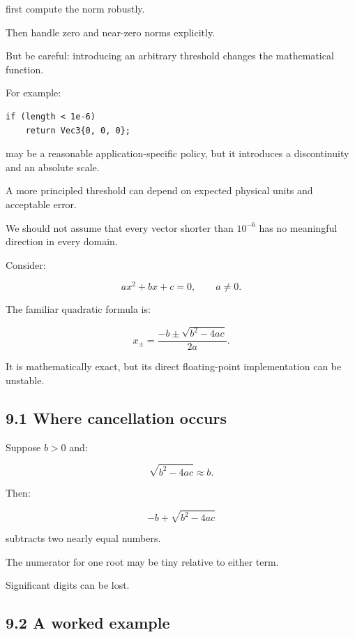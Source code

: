 first compute the norm robustly.

Then handle zero and near-zero norms explicitly.

But be careful: introducing an arbitrary threshold changes the mathematical function.

For example:

\begin{verbatim}
if (length < 1e-6)
    return Vec3{0, 0, 0};
\end{verbatim}

may be a reasonable application-specific policy, but it introduces a discontinuity and an absolute scale.

A more principled threshold can depend on expected physical units and acceptable error.

We should not assume that every vector shorter than \(10^{-6}\) has no meaningful direction in every domain.

Consider:

\[ \boxed{ax^2+bx+c=0}, \qquad a\ne0. \]

The familiar quadratic formula is:

\[ \boxed{ x_\pm= \frac{-b\pm\sqrt{b^2-4ac}}{2a} }. \]

It is mathematically exact, but its direct floating-point implementation can be unstable.

\subsection{9.1 Where cancellation occurs}\label{02-foundations-ii-ch028-where-cancellation-occurs}

\hypertarget{02-foundations-ii-ch028-where-cancellation-occurs}{}

Suppose \(b>0\) and:

\[ \sqrt{b^2-4ac}\approx b. \]

Then:

\[ -b+\sqrt{b^2-4ac} \]

subtracts two nearly equal numbers.

The numerator for one root may be tiny relative to either term.

Significant digits can be lost.

\subsection{9.2 A worked example}\label{02-foundations-ii-ch028-a-worked-example}

\hypertarget{02-foundations-ii-ch028-a-worked-example}{}

